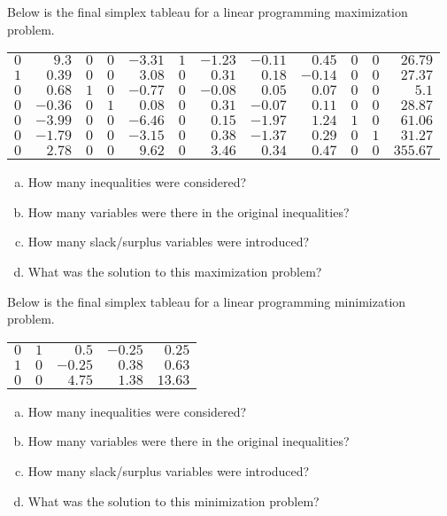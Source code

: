 \documentclass[11pt,letterpaper]{article}
\begin{document}
 Below is the final simplex tableau for a linear programming maximization problem. \par
	\begin{table}[H]
	\centering
	\begin{tabular}{rrrrrrrrrrrr}
	$0$ & $9.3$ & $0$ & $0$ & $-3.31$ & $1$ & $-1.23$ & $-0.11$ & $0.45$ & $0$ & $0$ & $26.79$ \\
	$1$ & $0.39$ & $0$ & $0$ & $3.08$ & $0$ & $0.31$ & $0.18$ & $-0.14$ & $0$ & $0$ & $27.37$ \\
	$0$ & $0.68$ & $1$ & $0$ & $-0.77$ & $0$ & $-0.08$ & $0.05$ & $0.07$ & $0$ & $0$ & $5.1$ \\
	$0$ & $-0.36$ & $0$ & $1$ & $0.08$ & $0$ & $0.31$ & $-0.07$ & $0.11$ & $0$ & $0$ & $28.87$ \\
	$0$ & $-3.99$ & $0$ & $0$ & $-6.46$ & $0$ & $0.15$ & $-1.97$ & $1.24$ & $1$ & $0$ & $61.06$ \\
	$0$ & $-1.79$ & $0$ & $0$ & $-3.15$ & $0$ & $0.38$ & $-1.37$ & $0.29$ & $0$ & $1$ & $31.27$ \\
	$0$ & $2.78$ & $0$ & $0$ & $9.62$ & $0$ & $3.46$ & $0.34$ & $0.47$ & $0$ & $0$ & $355.67$
	\end{tabular}
	\end{table}

\begin{enumerate}[(a)]
\item How many inequalities were considered?
\item How many variables were there in the original inequalities?
\item How many slack/surplus variables were introduced?
\item What was the solution to this maximization problem?
\end{enumerate}



\newpage



 Below is the final simplex tableau for a linear programming minimization problem. \par
	\begin{table}[H]
	\centering
	\begin{tabular}{rrrrr}
	$0$ & $1$ & $0.5$ & $-0.25$ & $0.25$ \\
	$1$ & $0$ & $-0.25$ & $0.38$ & $0.63$ \\
	$0$ & $0$ & $4.75$ & $1.38$ & $13.63$
	\end{tabular}
	\end{table}

\begin{enumerate}[(a)]
\item How many inequalities were considered?
\item How many variables were there in the original inequalities?
\item How many slack/surplus variables were introduced?
\item What was the solution to this minimization problem?
\end{enumerate}
\end{document}
